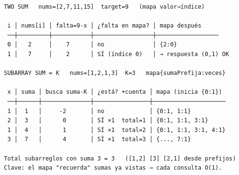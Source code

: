 \begin{dsacomofunciona}
\begin{verbatim}
TWO SUM   nums=[2,7,11,15]  target=9   (mapa valor→índice)

 i │ nums[i] │ falta=9-x │ ¿falta en mapa? │ mapa después
 ──┼─────────┼───────────┼─────────────────┼──────────────────
 0 │   2     │    7      │ no              │ {2:0}
 1 │   7     │    2      │ SÍ (índice 0)   │ → respuesta (0,1) OK

SUBARRAY SUM = K   nums=[1,2,1,3]  K=3   mapa{sumaPrefija:veces}

 x │ suma │ busca suma-K │ ¿está? +cuenta │ mapa (inicia {0:1})
 ──┼──────┼──────────────┼────────────────┼─────────────────────
 1 │  1   │     -2       │ no             │ {0:1, 1:1}
 2 │  3   │      0       │ SÍ ×1  total=1 │ {0:1, 1:1, 3:1}
 1 │  4   │      1       │ SÍ ×1  total=2 │ {0:1, 1:1, 3:1, 4:1}
 3 │  7   │      4       │ SÍ ×1  total=3 │ {..., 7:1}

Total subarreglos con suma 3 = 3   ([1,2] [3] [2,1] desde prefijos)
Clave: el mapa "recuerda" sumas ya vistas → cada consulta O(1).
\end{verbatim}
\end{dsacomofunciona}

